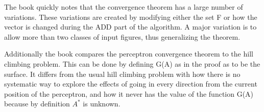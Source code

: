 \documentclass{article}
\begin{document}
	The book quickly notes that the convergence theorem has a large number of variations.
	These variations are created by modifying either the set F or how the vector is changed
	during the ADD part of the algorithm. A major variation is to allow more than two classes
	of input figures, thus generalizing the theorem.
	
	Additionally the book compares the perceptron convergence theorem to the hill climbing
	problem. This can be done by defining G(A) as in the proof as to be the surface. It 
	differs from the usual hill climbing problem with how there is no systematic way to
	explore the effects of going in every direction from the current position of the
	perceptron, and how it never has the value of the function G(A) because by definition
	$A^*$ is unknown.
	
	
	 
	
\end{document}
